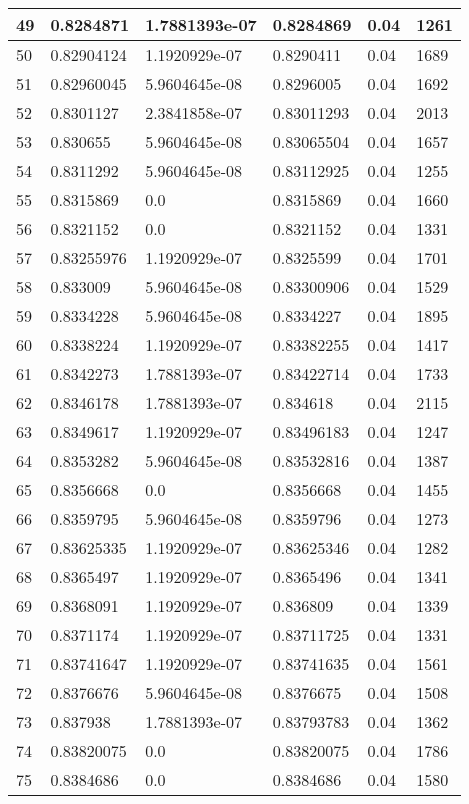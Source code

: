 \begin{longtable}{|l|l|l|l|l|l|}
49 & 0.8284871 & 1.7881393e-07 & 0.8284869 & 0.04 & 1261 \\ \hline 
50 & 0.82904124 & 1.1920929e-07 & 0.8290411 & 0.04 & 1689 \\ \hline 
51 & 0.82960045 & 5.9604645e-08 & 0.8296005 & 0.04 & 1692 \\ \hline 
52 & 0.8301127 & 2.3841858e-07 & 0.83011293 & 0.04 & 2013 \\ \hline 
53 & 0.830655 & 5.9604645e-08 & 0.83065504 & 0.04 & 1657 \\ \hline 
54 & 0.8311292 & 5.9604645e-08 & 0.83112925 & 0.04 & 1255 \\ \hline 
55 & 0.8315869 & 0.0 & 0.8315869 & 0.04 & 1660 \\ \hline 
56 & 0.8321152 & 0.0 & 0.8321152 & 0.04 & 1331 \\ \hline 
57 & 0.83255976 & 1.1920929e-07 & 0.8325599 & 0.04 & 1701 \\ \hline 
58 & 0.833009 & 5.9604645e-08 & 0.83300906 & 0.04 & 1529 \\ \hline 
59 & 0.8334228 & 5.9604645e-08 & 0.8334227 & 0.04 & 1895 \\ \hline 
60 & 0.8338224 & 1.1920929e-07 & 0.83382255 & 0.04 & 1417 \\ \hline 
61 & 0.8342273 & 1.7881393e-07 & 0.83422714 & 0.04 & 1733 \\ \hline 
62 & 0.8346178 & 1.7881393e-07 & 0.834618 & 0.04 & 2115 \\ \hline 
63 & 0.8349617 & 1.1920929e-07 & 0.83496183 & 0.04 & 1247 \\ \hline 
64 & 0.8353282 & 5.9604645e-08 & 0.83532816 & 0.04 & 1387 \\ \hline 
65 & 0.8356668 & 0.0 & 0.8356668 & 0.04 & 1455 \\ \hline 
66 & 0.8359795 & 5.9604645e-08 & 0.8359796 & 0.04 & 1273 \\ \hline 
67 & 0.83625335 & 1.1920929e-07 & 0.83625346 & 0.04 & 1282 \\ \hline 
68 & 0.8365497 & 1.1920929e-07 & 0.8365496 & 0.04 & 1341 \\ \hline 
69 & 0.8368091 & 1.1920929e-07 & 0.836809 & 0.04 & 1339 \\ \hline 
70 & 0.8371174 & 1.1920929e-07 & 0.83711725 & 0.04 & 1331 \\ \hline 
71 & 0.83741647 & 1.1920929e-07 & 0.83741635 & 0.04 & 1561 \\ \hline 
72 & 0.8376676 & 5.9604645e-08 & 0.8376675 & 0.04 & 1508 \\ \hline 
73 & 0.837938 & 1.7881393e-07 & 0.83793783 & 0.04 & 1362 \\ \hline 
74 & 0.83820075 & 0.0 & 0.83820075 & 0.04 & 1786 \\ \hline 
75 & 0.8384686 & 0.0 & 0.8384686 & 0.04 & 1580 \\ \hline 
\end{longtable}